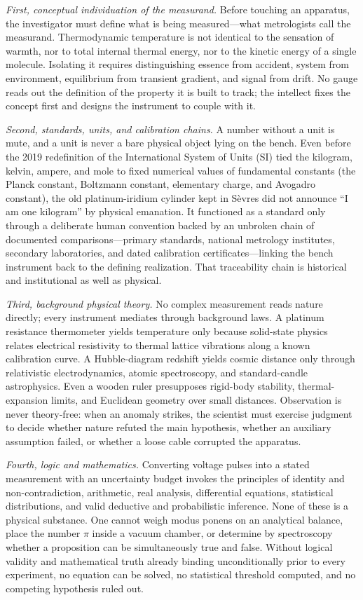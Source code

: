 \emph{First, conceptual individuation of the measurand.} Before touching an apparatus, the investigator must define what is being measured---what metrologists call the measurand. Thermodynamic temperature is not identical to the sensation of warmth, nor to total internal thermal energy, nor to the kinetic energy of a single molecule. Isolating it requires distinguishing essence from accident, system from environment, equilibrium from transient gradient, and signal from drift. No gauge reads out the definition of the property it is built to track; the intellect fixes the concept first and designs the instrument to couple with it.

\emph{Second, standards, units, and calibration chains.} A number without a unit is mute, and a unit is never a bare physical object lying on the bench. Even before the 2019 redefinition of the International System of Units (SI) tied the kilogram, kelvin, ampere, and mole to fixed numerical values of fundamental constants (the Planck constant, Boltzmann constant, elementary charge, and Avogadro constant), the old platinum-iridium cylinder kept in S\`evres did not announce ``I am one kilogram'' by physical emanation. It functioned as a standard only through a deliberate human convention backed by an unbroken chain of documented comparisons---primary standards, national metrology institutes, secondary laboratories, and dated calibration certificates---linking the bench instrument back to the defining realization. That traceability chain is historical and institutional as well as physical.

\emph{Third, background physical theory.} No complex measurement reads nature directly; every instrument mediates through background laws. A platinum resistance thermometer yields temperature only because solid-state physics relates electrical resistivity to thermal lattice vibrations along a known calibration curve. A Hubble-diagram redshift yields cosmic distance only through relativistic electrodynamics, atomic spectroscopy, and standard-candle astrophysics. Even a wooden ruler presupposes rigid-body stability, thermal-expansion limits, and Euclidean geometry over small distances. Observation is never theory-free: when an anomaly strikes, the scientist must exercise judgment to decide whether nature refuted the main hypothesis, whether an auxiliary assumption failed, or whether a loose cable corrupted the apparatus.

\emph{Fourth, logic and mathematics.} Converting voltage pulses into a stated measurement with an uncertainty budget invokes the principles of identity and non-contradiction, arithmetic, real analysis, differential equations, statistical distributions, and valid deductive and probabilistic inference. None of these is a physical substance. One cannot weigh modus ponens on an analytical balance, place the number $\pi$ inside a vacuum chamber, or determine by spectroscopy whether a proposition can be simultaneously true and false. Without logical validity and mathematical truth already binding unconditionally prior to every experiment, no equation can be solved, no statistical threshold computed, and no competing hypothesis ruled out.


